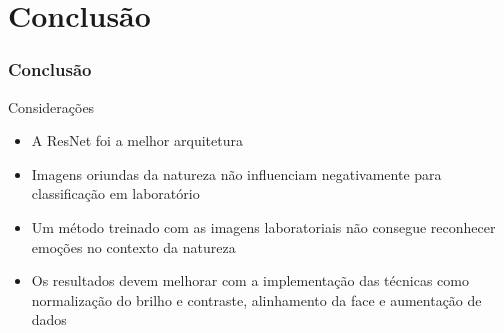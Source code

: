 \documentclass{beamer}
\begin{document}
\section{Conclusão}
\begin{frame}
\frametitle{Conclusão}
\begin{block}{Considerações}
\begin{itemize}
\pause 
\item A ResNet foi a melhor arquitetura
\pause
\item Imagens oriundas da natureza não influenciam negativamente para classificação em laboratório
\pause
\item Um método treinado com as imagens laboratoriais não consegue reconhecer emoções no contexto da natureza
\pause
\item Os resultados devem melhorar com a implementação das técnicas como normalização do brilho e contraste, alinhamento da face e aumentação de dados

\end{itemize}
\end{block}

\end{frame}
\end{document}
